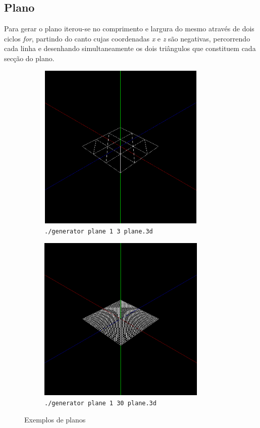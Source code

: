 \documentclass[11pt,a4paper]{report}
\begin{document}
\subsection{Plano}
\vspace{0.5cm}
Para gerar o plano iterou-se no comprimento e largura do mesmo através de dois ciclos \textit{for}, partindo do canto cujas coordenadas \textit{x} e \textit{z} são negativas, percorrendo cada linha e desenhando simultaneamente os dois triângulos que constituem cada secção do plano. 
\vspace{1cm}
\begin{figure}[H]
\centering
\begin{subfigure}{0.5\textwidth}
  \centering
  \includegraphics[width = 8cm,height = 8cm]{plano1.png}
  \caption{\texttt{./generator plane 1 3 plane.3d}}
  \label{fig:plano1}
\end{subfigure}%
\begin{subfigure}{0.5\textwidth}
  \centering
  \includegraphics[width = 8cm,height = 8cm]{plano2.png}
  \caption{\texttt{./generator plane 1 30 plane.3d}}
  \label{fig:plano2}
\end{subfigure}
\caption{Exemplos de planos}
\label{fig:plano}
\end{figure}
\end{document}
